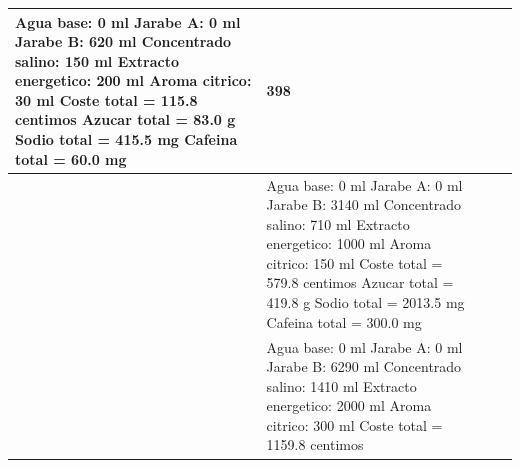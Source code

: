 \documentclass[11pt]{article}
\begin{document}
\begin{enumerate}[label=\alph*)]
\begin{table}[H]
\begin{tabular}{| >{\centering\arraybackslash}m{3cm} | m{5.75cm} | >{\centering\arraybackslash}m{3cm} | >{\centering\arraybackslash}m{4.5cm} |}
            \scriptsize
            Agua base: 0 ml \newline
            Jarabe A: 0 ml \newline
            Jarabe B: 620 ml \newline
            Concentrado salino: 150 ml \newline
            Extracto energetico: 200 ml \newline
            Aroma citrico: 30 ml \newline
             \newline
            Coste total = 115.8 centimos \newline
            Azucar total = 83.0 g \newline
            Sodio total = 415.5 mg \newline
            Cafeina total = 60.0 mg
            & 398 & 317
            \\
            \hline
            5000 & 
            \scriptsize
            Agua base: 0 ml \newline
            Jarabe A: 0 ml \newline
            Jarabe B: 3140 ml \newline
            Concentrado salino: 710 ml \newline
            Extracto energetico: 1000 ml \newline
            Aroma citrico: 150 ml \newline
             \newline
            Coste total = 579.8 centimos \newline
            Azucar total = 419.8 g \newline
            Sodio total = 2013.5 mg \newline
            Cafeina total = 300.0 mg
            & 41031 & 8998
            \\
            \hline
            10000 & 
            \scriptsize
            Agua base: 0 ml \newline
            Jarabe A: 0 ml \newline
            Jarabe B: 6290 ml \newline
            Concentrado salino: 1410 ml \newline
            Extracto energetico: 2000 ml \newline
            Aroma citrico: 300 ml \newline
             \newline
            Coste total = 1159.8 centimos \newline

\end{tabular}
\end{table}
\end{enumerate}
\end{document}
